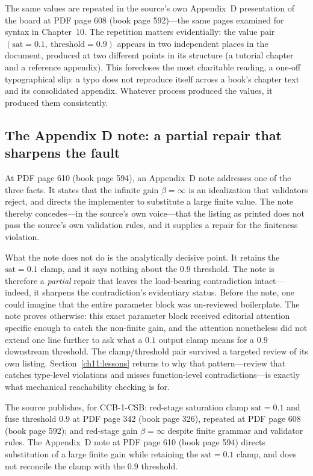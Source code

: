 The same values are repeated in the source's own Appendix~D presentation of the board at PDF page 608 (book page 592)---the same pages examined for syntax in Chapter~10. The repetition matters evidentially: the value pair $(\mathrm{sat}=0.1,\ \mathrm{threshold}=0.9)$ appears in two independent places in the document, produced at two different points in its structure (a tutorial chapter and a reference appendix). This forecloses the most charitable reading, a one-off typographical slip: a typo does not reproduce itself across a book's chapter text and its consolidated appendix. Whatever process produced the values, it produced them consistently.

\subsection{The Appendix D note: a partial repair that sharpens the fault}\label{ch11:note}

At PDF page 610 (book page 594), an Appendix~D note addresses one of the three facts. It states that the infinite gain $\beta=\infty$ is an idealization that validators reject, and directs the implementer to substitute a large finite value. The note thereby concedes---in the source's own voice---that the listing as printed does not pass the source's own validation rules, and it supplies a repair for the finiteness violation.

What the note does not do is the analytically decisive point. It retains the $\mathrm{sat}=0.1$ clamp, and it says nothing about the $0.9$ threshold. The note is therefore a \emph{partial} repair that leaves the load-bearing contradiction intact---indeed, it sharpens the contradiction's evidentiary status. Before the note, one could imagine that the entire parameter block was un-reviewed boilerplate. The note proves otherwise: this exact parameter block received editorial attention specific enough to catch the non-finite gain, and the attention nonetheless did not extend one line further to ask what a $0.1$ output clamp means for a $0.9$ downstream threshold. The clamp/threshold pair survived a targeted review of its own listing. Section~\ref{ch11:lessons} returns to why that pattern---review that catches type-level violations and misses function-level contradictions---is exactly what mechanical reachability checking is for.

\begin{finding}\label{ch11:find-values}
The source publishes, for CCB-1-CSB: red-stage saturation clamp $\mathrm{sat}=0.1$ and fuse threshold $0.9$ at PDF page 342 (book page 326), repeated at PDF page 608 (book page 592); and red-stage gain $\beta=\infty$ despite finite grammar and validator rules. The Appendix~D note at PDF page 610 (book page 594) directs substitution of a large finite gain while retaining the $\mathrm{sat}=0.1$ clamp, and does not reconcile the clamp with the $0.9$ threshold.
\end{finding}

